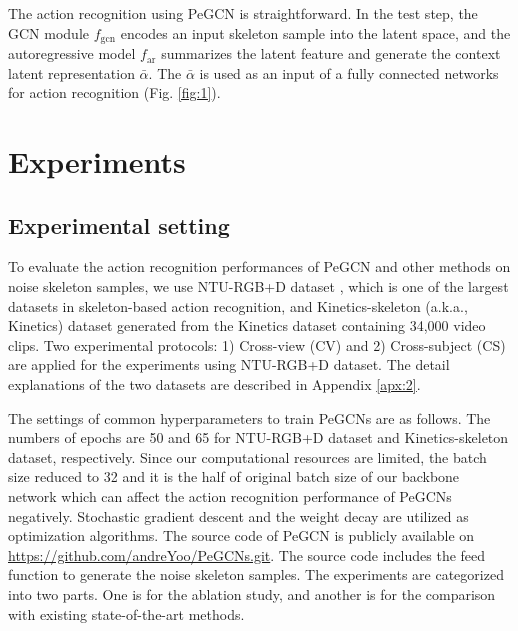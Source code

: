 \documentclass[runningheads]{llncs}
\begin{document}
The action recognition using PeGCN is straightforward. In the test step, the GCN module $f_{\text{gcn}}$ encodes an input skeleton sample into the latent space, and the autoregressive model $f_{\text{ar}}$ summarizes the latent feature and generate the context latent representation $\bar{\alpha}$. The $\bar{\alpha}$ is used as an input of a fully connected networks for action recognition (Fig. \ref{fig:1}).

\section{Experiments}
\label{sec:4}
\subsection{Experimental setting}
To evaluate the action recognition performances of PeGCN and other methods on noise skeleton samples, we use NTU-RGB+D dataset \cite{shahroudy2016ntu}, which is one of the largest datasets in skeleton-based action recognition, and Kinetics-skeleton (a.k.a., Kinetics) dataset generated from the Kinetics dataset \cite{kay2017kinetics} containing 34,000 video clips. Two experimental protocols: 1) Cross-view (CV) and 2) Cross-subject (CS) are applied for the experiments using NTU-RGB+D dataset. The detail explanations of the two datasets are described in Appendix \ref{apx:2}.

The settings of common hyperparameters to train PeGCNs are as follows. The numbers of epochs are 50 and 65 for NTU-RGB+D dataset and Kinetics-skeleton dataset, respectively. Since our computational resources are limited, the batch size reduced to 32 and it is the half of original batch size of our backbone network \cite{shi2019two} which can affect the action recognition performance of PeGCNs negatively. Stochastic gradient descent and the weight decay are utilized as optimization algorithms. The source code of PeGCN is publicly available on \url{https://github.com/andreYoo/PeGCNs.git}. The source code includes the feed function to generate the noise skeleton samples. The experiments are categorized into two parts. One is for the ablation study, and another is for the comparison with existing state-of-the-art methods.
\end{document}
